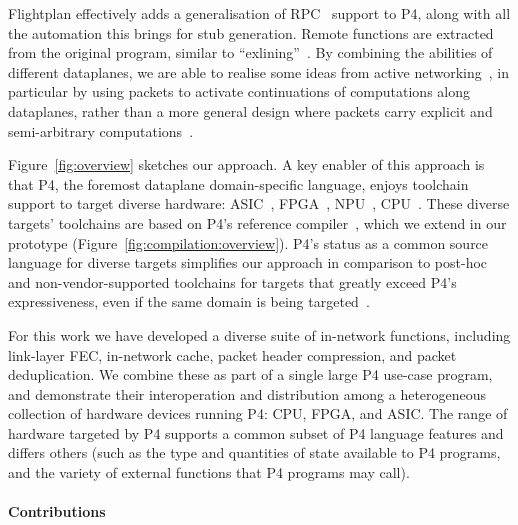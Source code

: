 \documentclass[letterpaper,twocolumn,10pt]{article}
\begin{document}
Flightplan effectively adds a generalisation of
RPC~\cite{Birrell:1984:IRP:2080.357392} support to P4, along with all the
automation this brings for stub generation.  Remote functions are extracted
from the original program, similar to
``exlining''~\cite{Vahid:1995:PEN:224270.224380}.
By combining the abilities of different dataplanes, we are able to realise
some ideas from active networking~\cite{Alexander:1997:AB:263109.263149},
in particular by using packets to activate continuations of computations along
dataplanes, rather than a more general design where packets carry explicit and
semi-arbitrary computations~\cite{Schwartz:2000:SPA:332799.332893}.

Figure~\ref{fig:overview} sketches our approach.
A key enabler of this approach is that P4, the foremost dataplane
domain-specific language, enjoys toolchain support to target diverse
hardware:
  ASIC~\cite{tofino},
  FPGA~\cite{sdnet,p4fpga,netcope},
  NPU~\cite{agilio},
  CPU~\cite{bmv2}.
These diverse targets' toolchains are based on P4's reference
compiler~\cite{p4c}, which we extend in our prototype
(Figure~\ref{fig:compilation:overview}).
P4's status as a common source language for diverse targets
simplifies our approach in comparison to post-hoc and
non-vendor-supported toolchains for targets that greatly exceed P4's
expressiveness, even if the same domain is being
targeted~\cite{203245}.

For this work we have developed a diverse suite of in-network
functions, including link-layer FEC, in-network cache, packet header
compression, and packet deduplication. We combine these as part of a
single large P4 use-case program, and demonstrate their interoperation
and distribution among a heterogeneous collection of hardware devices
running P4: CPU, FPGA, and ASIC.
The range of hardware targeted by P4 supports a common subset of P4
language features and differs others (such as the type and quantities
of state available to P4 programs, and the variety of external
functions that P4 programs may call).


\paragraph{Contributions}
\TODO{}
\end{document}
